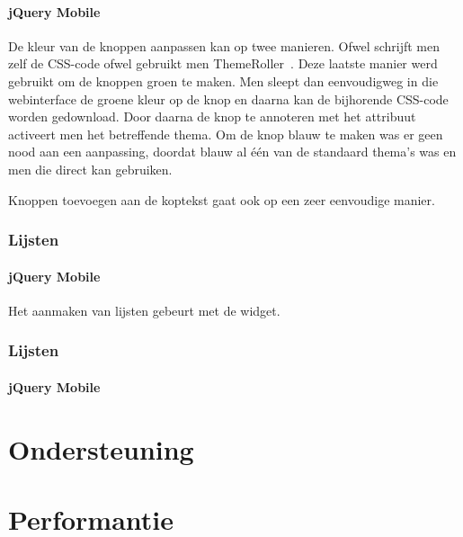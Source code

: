 \paragraph{jQuery Mobile} 
De kleur van de knoppen aanpassen kan op twee manieren. 
Ofwel schrijft men zelf de CSS-code ofwel gebruikt men ThemeRoller~\cite{JQuery2012c}. 
Deze laatste manier werd gebruikt om de knoppen groen te maken. 
Men sleept dan eenvoudigweg in die webinterface de groene kleur op de knop en daarna kan de bijhorende CSS-code worden gedownload. 
Door daarna de knop te annoteren met het  attribuut activeert men het betreffende thema. 
Om de knop blauw te maken was er geen nood aan een aanpassing, doordat blauw al één van de standaard thema's was en men die direct kan gebruiken.

Knoppen toevoegen aan de koptekst gaat ook op een zeer eenvoudige manier.

\subsubsection{Lijsten}

\paragraph{jQuery Mobile} 
Het aanmaken van lijsten gebeurt met de  widget.

\subsubsection{Lijsten}

\paragraph{jQuery Mobile} 

\section{Ondersteuning}
\section{Performantie}